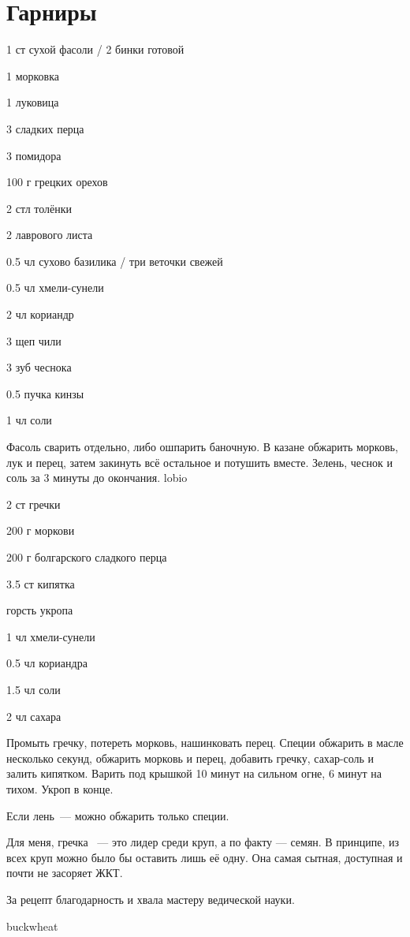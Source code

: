 \chapter*{Гарниры}
\label{sec:garnish}



{
\item 1 ст сухой  фасоли / 2 бинки готовой
\item 1 морковка 
\item 1 луковица
\item 3 сладких перца
\item 3 помидора
\item 100 г грецких орехов 
\item 2 стл толёнки 
}{
\item 2 лаврового листа
\item 0.5 чл сухово базилика / три веточки свежей
\item 0.5 чл хмели-сунели
\item 2 чл кориандр
\item 3 щеп чили 
\item 3 зуб чеснока 
\item 0.5 пучка кинзы
\item 1 чл соли
}{
Фасоль сварить отдельно, либо ошпарить баночную. В казане обжарить морковь, лук и перец, затем закинуть всё остальное и потушить вместе. Зелень, чеснок и соль за 3 минуты до окончания.
}{}{lobio}

{
\item 2 ст гречки
\item 200 г моркови
\item 200 г болгарского сладкого перца
\item 3.5 ст кипятка
\item горсть укропа
}{
\item 1 чл хмели-сунели
\item 0.5 чл кориандра
\item 1.5 чл соли
\item 2 чл сахара
}{
Промыть гречку, потереть морковь, нашинковать перец. Специи обжарить в масле несколько секунд, обжарить морковь и перец, добавить гречку, сахар-соль и залить кипятком. Варить под крышкой 10 минут на сильном огне, 6 минут на тихом. Укроп в конце.
}{
\begin{advice}
\item Если лень~--- можно обжарить только специи.
\item Для меня, гречка ~--- это лидер среди круп, а по факту — семян. В принципе, из всех круп можно было бы оставить лишь её одну. Она самая сытная, доступная и почти не засоряет ЖКТ. 
\item За рецепт благодарность и хвала мастеру ведической науки. 
\end{advice}}{buckwheat}



